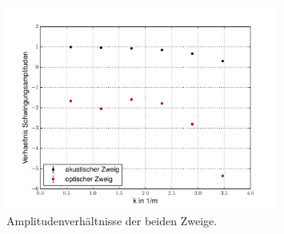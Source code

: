 \begin{figure}[h]
	\centering\includegraphics[width=0.8\textwidth]{fig/amplituden}
	\caption{Amplitudenverhältnisse der beiden Zweige.}
	\label{fig:amplituden}
\end{figure}